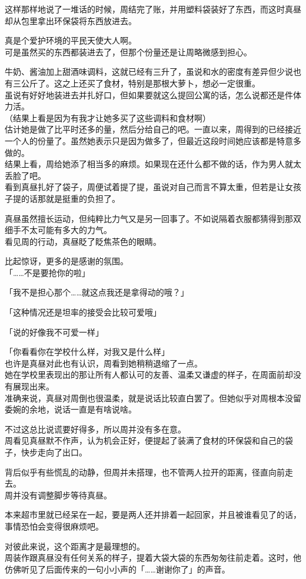 这样那样地说了一堆话的时候，周结完了账，并用塑料袋装好了东西，而这时真昼却从包里拿出环保袋将东西放进去。

真是个爱护环境的平民天使大人啊。\\

可是虽然买的东西都装进去了，但那个份量还是让周略微感到担心。

牛奶、酱油加上甜酒味调料，这就已经有三升了，虽说和水的密度有差异但少说也有三公斤了。这之上还买了食材，特别是那根大萝卜，想必一定很重。\\

虽说有好好地装进去并扎好口，但如果要就这么提回公寓的话，怎么说都还是件体力活。\\

（结果上看是因为有我才让她多买了这些调料和食材啊）\\

估计她是做了比平时还多的量，然后分给自己的吧。一直以来，周得到的已经接近一个人的份量了。虽然她表示只是因为做多了，但最近这段时间她应该都是特意多做的。\\

结果上看，周给她添了相当多的麻烦。如果现在还什么都不做的话，作为男人就太丢脸了吧。\\

看到真昼扎好了袋子，周便试着提了提，虽说对自己而言不算太重，但若是让女孩子提的话那就是挺重的负担了。

真昼虽然擅长运动，但纯粹比力气又是另一回事了。不如说隔着衣服都猜得到那双细手不太可能有多大的力气。\\

看见周的行动，真昼眨了眨焦茶色的眼睛。

比起惊讶，更多的是感谢的氛围。\\

「……不是要抢你的啦」

「我不是担心那个……就这点我还是拿得动的哦？」

「这种情况还是坦率的接受会比较可爱哦」

「说的好像我不可爱一样」

「你看看你在学校什么样，对我又是什么样」\\

也许是真昼对此也有认识，周看到她稍稍退缩了一点。\\

她在学校里表现出的那让所有人都认可的友善、温柔又谦虚的样子，在周面前却没有展现出来。\\

准确来说，真昼对周倒也很温柔，就是说话比较直白罢了。但她似乎对周根本没留委婉的余地，说话一直是有啥说啥。

不过这总比说谎要好得多，所以周并没有多在意。\\

周看见真昼默不作声，认为机会正好，便提起了装满了食材的环保袋和自己的袋子，快步走向了出口。

背后似乎有些慌乱的动静，但周并未搭理，也不管两人拉开的距离，径直向前走去。\\

周并没有调整脚步等待真昼。

本来超市里就已经呆在一起，要是两人还并排着一起回家，并且被谁看见了的话，事情恐怕会变得很麻烦吧。

对彼此来说，这个距离才是最理想的。\\

周装作跟真昼没有任何关系的样子，提着大袋大袋的东西匆匆往前走着。这时，他仿佛听见了后面传来的一句小小声的「……谢谢你了」的声音。
